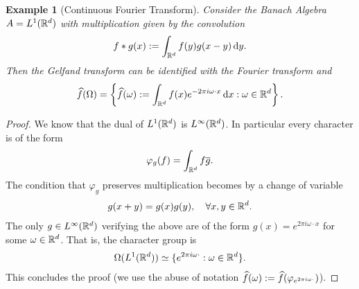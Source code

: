 \documentclass[12pt]{article}
\newtheorem{example}{Example}
\renewcommand{\d}{\,\mathrm{d}}
\begin{document}
\begin{CJK*}{UTF8}{gbsn}
	\begin{example}[Continuous Fourier Transform]
		Consider the Banach Algebra $A=L^1(\mathbb{R}^d)$ with multiplication given by the convolution
		\begin{align*}
			f\star g(x):= \int_{\R^d}f(y)g(x-y) \d y.
		\end{align*}
		Then the Gelfand transform can be identified with the Fourier transform and	\begin{align*}
			\wh{f}(\Omega)= \left\{ \wh{f}(\omega):= \int_{\R^d} f(x)e^{-2\pi i \omega \cdot  x} \d x:\omega\in \R^d\right\} .
		\end{align*}
	\end{example}
	\begin{proof}


		We know that the dual of $L^1(\mathbb{R}^d)$ is $L^\infty(\mathbb{R}^d)$. In particular every character is of the form
		\begin{align*}
			\varphi_g (f)= \int_{\mathbb{R}^d}f \overline{g}.
		\end{align*}
		The condition that $\varphi_g$ preserves multiplication becomes by a change of variable
		\begin{align*}
			g(x+y)=g(x)g(y), \quad\forall x,y \in \mathbb{R}^d.
		\end{align*}
		The only $g \in L^\infty (\mathbb{R}^d)$ verifying the above are of the form $g(x)= e^{2\pi i \omega \cdot  x}$ for some $\omega \in \mathbb{R}^d$. That is, the character group is
		\begin{align*}
			\Omega(L^1(\mathbb{R}^d))\simeq\{e^{2\pi i \omega \cdot }: \omega \in \mathbb{R}^d\} .
		\end{align*}
		This concludes the proof (we use the abuse of notation $\widehat{f}(\omega):=\widehat{f}(\varphi_{e^{2\pi i \omega \cdot }})$).
	\end{proof}



\end{CJK*}
\end{document}
